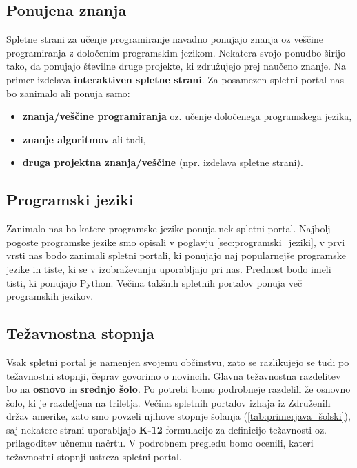 \subsection{Ponujena znanja}
\label{sec:vsebina_problemsk_pristop}

Spletne strani za učenje programiranje navadno ponujajo znanja oz
veščine programiranja z določenim programskim jezikom. Nekatera svojo
ponudbo širijo tako, da ponujajo številne druge projekte, ki
združujejo prej naučeno znanje. Na primer izdelava
\textbf{interaktiven spletne strani}. Za posamezen spletni portal nas
bo zanimalo ali ponuja samo:

\begin{itemize}
  \tightlist
\item \textbf{znanja/veščine programiranja} oz. učenje določenega
  programskega jezika,
\item \textbf{znanje algoritmov} ali tudi,
\item \textbf{druga projektna znanja/veščine} (npr. izdelava spletne
  strani).
\end{itemize}


\subsection{Programski jeziki}
\label{sec:_zanaja_programski_jeziki}

Zanimalo nas bo katere programske jezike ponuja nek spletni
portal. Najbolj pogoste programske jezike smo opisali v poglavju
\ref{sec:programski_jeziki}, v prvi vrsti nas bodo zanimali spletni
portali, ki ponujajo naj popularnejše programske jezike in tiste, ki
se v izobraževanju uporabljajo pri nas. Prednost bodo imeli tisti,
ki ponujajo Python. Večina takšnih spletnih portalov ponuja več
programskih jezikov. 

\subsection{Težavnostna stopnja}
\label{sec:težavnostna_stopnja}

Vsak spletni portal je namenjen svojemu občinstvu, zato se razlikujejo
se tudi po težavnostni stopnji, čeprav govorimo o novincih. Glavna
težavnostna razdelitev bo na \textbf{osnovo} in \textbf{srednjo
  šolo}. Po potrebi bomo podrobneje razdelili že osnovno šolo, ki je
razdeljena na triletja. Večina spletnih portalov izhaja iz Združenih
držav amerike, zato smo povzeli njihove stopnje šolanja
(\ref{tab:primerjava_šolski}), saj nekatere strani uporabljajo
\textbf{K-12} formulacijo za definicijo težavnosti oz. prilagoditev
učnemu načrtu. V podrobnem pregledu bomo ocenili, kateri težavnostni
stopnji ustreza spletni portal.

